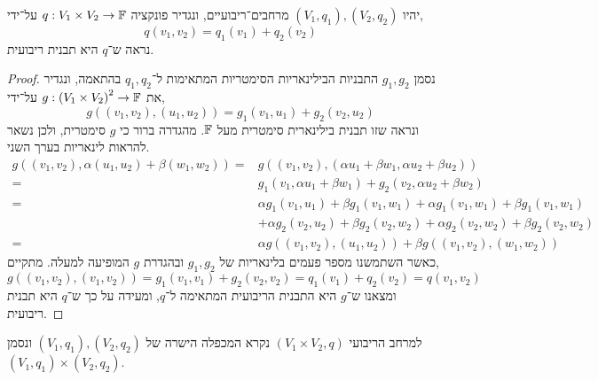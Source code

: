 \question{}
יהיו $(V_1, q_1), (V_2, q_2)$ מרחבים־ריבועיים, ונגדיר פונקציה $q : V_1 \times V_2 \to \mathbb{F}$ על־ידי,
\[
	q(v_1, v_2)
	= q_1(v_1) + q_2(v_2)
\]
נראה ש־$q$ היא תבנית ריבועית.
\begin{proof}
	נסמן $g_1, g_2$ התבניות הבילינאריות הסימטריות המתאימות ל־$q_1, q_2$ בהתאמה, ונגדיר את $g : {(V_1 \times V_2)}^2 \to \mathbb{F}$ על־ידי,
	\[
		g((v_1, v_2), (u_1, u_2))
		= g_1(v_1, u_1) + g_2(v_2, u_2)
	\]
	ונראה שזו תבנית בילינארית סימטרית מעל $\mathbb{F}$.
	מהגדרה ברור כי $g$ סימטרית, ולכן נשאר להראות לינאריות בערך השני.
	\begin{align*}
		g((v_1, v_2), \alpha (u_1, u_2) + \beta (w_1, w_2))
		= & g((v_1, v_2), (\alpha u_1 + \beta w_1, \alpha u_2 + \beta u_2)) \\
		= & g_1(v_1, \alpha u_1 + \beta w_1) + g_2(v_2, \alpha u_2 + \beta w_2) \\
		= & \alpha g_1(v_1, u_1) + \beta g_1(v_1, w_1) + \alpha g_1(v_1, w_1) + \beta g_1(v_1, w_1) \\
		  & + \alpha g_2(v_2, u_2) + \beta g_2(v_2, w_2) + \alpha g_2(v_2, w_2) + \beta g_2(v_2, w_2) \\
		= & \alpha g((v_1, v_2), (u_1, u_2)) + \beta g((v_1, v_2), (w_1, w_2))
	\end{align*}
	כאשר השתמשנו מספר פעמים בלינאריות של $g_1, g_2$ ובהגדרת $g$ המופיעה למעלה.
	מתקיים,
	\[
		g((v_1, v_2), (v_1, v_2))
		= g_1(v_1, v_1) + g_2(v_2, v_2)
		= q_1(v_1) + q_2(v_2)
		= q(v_1, v_2)
	\]
	ומצאנו ש־$g$ היא התבנית הריבועית המתאימה ל־$q$, ומעידה על כך ש־$q$ היא תבנית ריבועית.
\end{proof}
\begin{definition}
	למרחב הריבועי $(V_1 \times V_2, q)$ נקרא המכפלה הישרה של $(V_1, q_1), (V_2, q_2)$ ונסמן $(V_1, q_1) \times (V_2, q_2)$.
\end{definition}

